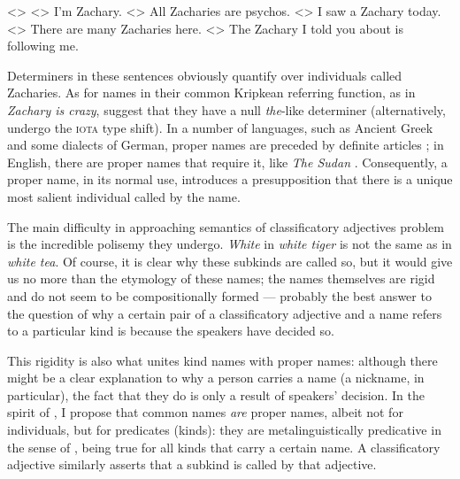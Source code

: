 \documentclass[a4paper, 12pt]{article}
\begin{document}
\pex<>
    \a<> I'm Zachary.
    \a<> All Zacharies are psychos.
    \a<> I saw a Zachary today.
    \a<> There are many Zacharies here.
    \a<> The Zachary I told you about is following me.
\xe

Determiners in these sentences obviously quantify over individuals called Zacharies. As for names in their common Kripkean referring function, as in \textit{Zachary is crazy}, \textcite{larson1995knowledgemeaningintroduction,elbourne2005situationsindividuals} suggest that they have a null \textit{the}-like determiner (alternatively, undergo the \textsc{iota} type shift). In a number of languages, such as Ancient Greek and some dialects of German, proper names are preceded by definite articles \parencite{elbourne2005situationsindividuals}; in English, there are proper names that require it, like \textit{The Sudan} \parencite{krifka1995genericityintroduction}. Consequently, a proper name, in its normal use, introduces a presupposition that there is a unique most salient individual called by the name.



The main difficulty in approaching semantics of classificatory adjectives problem is the incredible polisemy they undergo. \textit{White} in \textit{white tiger} is not the same as in \textit{white tea}. Of course, it is clear why these subkinds are called so, but it would give us no more than the etymology of these names; the names themselves are rigid and do not seem to be compositionally formed --- probably the best answer to the question of why a certain pair of a classificatory adjective and a name refers to a particular kind is because the speakers have decided so.

This rigidity is also what unites kind names with proper names: although there might be a clear explanation to why a person carries a name (a nickname, in particular), the fact that they do is only a result of speakers' decision. In the spirit of \parencite{kripke1980namingnecessity}, I propose that common names \emph{are} proper names, albeit not for individuals, but for predicates (kinds): they are metalinguistically predicative in the sense of \parencite{burge1973referencepropernames}, being true for all kinds that carry a certain name. A classificatory adjective similarly asserts that a subkind is called by that adjective.
\end{document}
